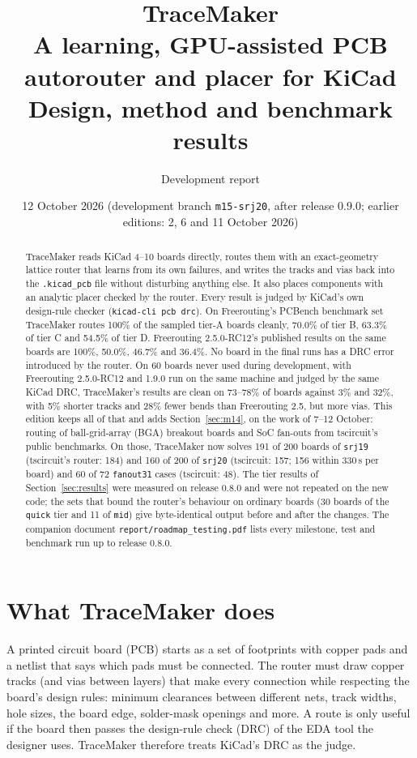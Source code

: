 \documentclass[10pt,a4paper]{article}
\title{\textbf{TraceMaker}\\[2pt]\large A learning, GPU-assisted PCB autorouter and placer for KiCad\\[2pt]
\normalsize Design, method and benchmark results}
\author{Development report}
\date{12 October 2026 (development branch \texttt{m15-srj20}, after release 0.9.0; earlier editions: 2, 6 and 11 October 2026)}
\begin{document}
\maketitle

\begin{abstract}
\noindent TraceMaker reads KiCad 4--10 boards directly, routes them with an exact-geometry lattice router
that learns from its own failures, and writes the tracks and vias back into the \texttt{.kicad\_pcb} file
without disturbing anything else. It also places components with an analytic placer checked by the router.
Every result is judged by KiCad's own design-rule checker (\texttt{kicad-cli pcb drc}). On Freerouting's PCBench
benchmark set TraceMaker routes 100\% of the sampled tier-A boards cleanly, 70.0\% of tier B, 63.3\% of tier C and
54.5\% of tier D. Freerouting 2.5.0-RC12's published results on the same boards are 100\%, 50.0\%, 46.7\% and
36.4\%. No board in the final runs has a DRC error introduced by the router. On 60 boards never used during
development, with Freerouting 2.5.0-RC12 and 1.9.0 run on the same machine and judged by the same KiCad DRC,
TraceMaker's results are clean on 73--78\% of boards against 3\% and 32\%, with 5\% shorter tracks and 28\% fewer
bends than Freerouting 2.5, but more vias. This edition keeps all of that and adds Section~\ref{sec:m14}, on the
work of 7--12 October: routing of ball-grid-array (BGA) breakout boards and SoC fan-outs from tscircuit's public
benchmarks. On those, TraceMaker now solves 191 of 200 boards of \texttt{srj19} (tscircuit's router: 184) and 160 of 200
of \texttt{srj20} (tscircuit: 157; 156 within 330\,s per board) and 60 of 72 \texttt{fanout31} cases (tscircuit:
48). The tier results of Section~\ref{sec:results} were measured on release 0.8.0 and were not repeated on the new
code; the sets that bound the router's behaviour on ordinary boards (30 boards of the \texttt{quick} tier and 11 of
\texttt{mid}) give byte-identical output before and after the changes. The companion document
\texttt{report/roadmap\_testing.pdf} lists every milestone, test and benchmark run up to release 0.8.0.
\end{abstract}

\section{What TraceMaker does}

A printed circuit board (PCB) starts as a set of footprints with copper pads and a netlist that says which pads
must be connected. The router must draw copper tracks (and vias between layers) that make every connection while
respecting the board's design rules: minimum clearances between different nets, track widths, hole sizes, the
board edge, solder-mask openings and more. A route is only useful if the board then passes the design-rule check
(DRC) of the EDA tool the designer uses. TraceMaker therefore treats KiCad's DRC as the judge.
\end{document}
